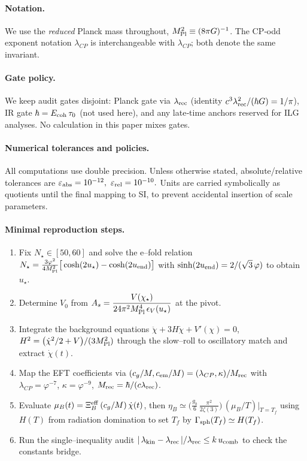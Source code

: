 \documentclass[11pt]{article}
\begin{document}
\paragraph{Notation.}
We use the \emph{reduced} Planck mass throughout, \(M_{\rm Pl}^2\equiv (8\pi G)^{-1}\). The CP‑odd exponent notation \(\lambda_{CP}\) is interchangeable with \(\lambda_{CP}\); both denote the same invariant.

\paragraph{Gate policy.}
We keep audit gates disjoint: Planck gate via \(\lambda_{\rm rec}\) (identity \(c^3\lambda_{\rm rec}^2/(\hbar G)=1/\pi\)), IR gate \(\hbar=E_{\rm coh}\,\tau_0\) (not used here), and any late‑time anchors reserved for ILG analyses. No calculation in this paper mixes gates.

\paragraph{Numerical tolerances and policies.}
All computations use double precision. Unless otherwise stated, absolute/relative tolerances are
\(
  \varepsilon_{\rm abs}=10^{-12},\ \varepsilon_{\rm rel}=10^{-10}.
\)
Units are carried symbolically as quotients until the final mapping to SI, to prevent accidental insertion of scale parameters.

\paragraph{Minimal reproduction steps.}
\begin{enumerate}
  \item Fix \(N_\star\in[50,60]\) and solve the e–fold relation
        \(N_\star=\tfrac{3\varphi^2}{4M_{\rm Pl}^2}\big[\cosh(2u_\star)-\cosh(2u_{\rm end})\big]\)
        with \(\sinh(2u_{\rm end})=2/(\sqrt{3}\,\varphi)\) to obtain \(u_\star\).
  \item Determine \(V_0\) from \(A_s=\dfrac{V(\chi_\star)}{24\pi^2 M_{\rm Pl}^4\,\epsilon_V(u_\star)}\) at the pivot.
  \item Integrate the background equations \(\ddot\chi+3H\dot\chi+V'(\chi)=0\), \(H^2=\big(\dot\chi^2/2+V\big)/(3M_{\rm Pl}^2)\) through the slow–roll to oscillatory match and extract \(\dot\chi(t)\).
  \item Map the EFT coefficients via \((c_g/M,c_{\rm em}/M)=(\lambda_{CP},\kappa)/M_{\rm rec}\) with \(\lambda_{CP}=\varphi^{-7}\), \(\kappa=\varphi^{-9}\), \(M_{\rm rec}=\hbar/(c\lambda_{\rm rec})\).
  \item Evaluate \(\mu_B(t)=\Xi_B^{\rm eff}\,(c_g/M)\,\dot\chi(t)\), then
        \(
          \eta_B\simeq \big(\tfrac{g_b}{6}\,\tfrac{\pi^2}{2\zeta(3)}\big)\,(\mu_B/T)|_{T=T_f}
        \)
        using \(H(T)\) from radiation domination to set \(T_f\) by \(\Gamma_{\rm sph}(T_f)\simeq H(T_f)\).
  \item Run the single–inequality audit
        \(
          |\,\lambda_{\rm kin}-\lambda_{\rm rec}\,|/\lambda_{\rm rec} \le k\,u_{\rm comb}
        \)
        to check the constants bridge.
\end{enumerate}
\end{document}
